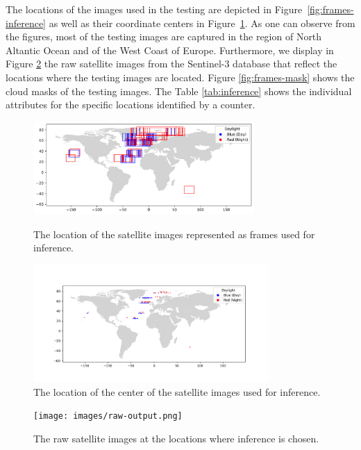 \documentclass[sigplan,screen]{acmart}
\begin{document}
The locations of the images used in the testing are depicted in Figure~\ref{fig:frames-inference} as well as their coordinate centers in Figure~\ref{fig:frames-dot}. As one can observe from the figures, most of the testing images are captured in the region of North Altantic Ocean and of the West Coast of Europe.
Furthermore, we display in Figure \ref{fig:frames-raw} the raw satellite images from the Sentinel-3 database that reflect the locations where the testing images are located. Figure \ref{fig:frames-mask} shows the cloud masks of the testing images.
The Table \ref{tab:inference} shows the individual attributes for the specific locations identified by a counter.

\begin{figure}[htb]
\centering\includegraphics[width=0.75\textwidth]{images/inference-frames.pdf}
\caption{The location of the satellite images represented as frames used for inference.}
\label{fig:frames-inference}

\centering\includegraphics[width=0.8\textwidth]{images/inference-dots.png}
\caption{The location of the center of the satellite images used for inference.}
\label{fig:frames-dot}
\end{figure}

\begin{figure}[htb]
\centering\texttt{[image: images/raw-output.png]}
\caption{The raw satellite images at the locations where inference is chosen.}
\label{fig:frames-raw}
\end{figure}
\end{document}
